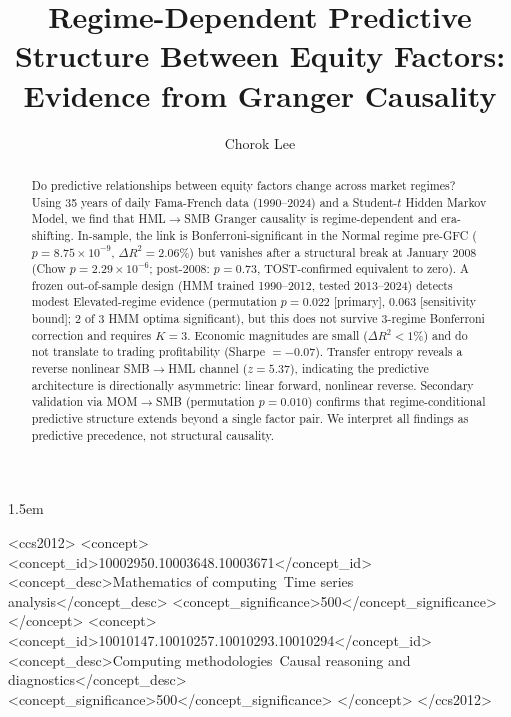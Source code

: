 \documentclass[sigconf,anonymous]{acmart}
\begin{document}
\sloppy
\emergencystretch 1.5em

\title{Regime-Dependent Predictive Structure Between Equity Factors: Evidence from Granger Causality}

\author{Chorok Lee}

\begin{abstract}
Do predictive relationships between equity factors change across market regimes?
Using 35 years of daily Fama-French data (1990--2024) and a Student-$t$ Hidden
Markov Model, we find that HML$\to$SMB Granger causality is regime-dependent and
era-shifting.
In-sample, the link is Bonferroni-significant in the Normal regime pre-GFC
($p = 8.75 \times 10^{-9}$, $\Delta R^2 = 2.06\%$) but vanishes after a
structural break at January 2008 (Chow $p = 2.29\times10^{-6}$; post-2008:
$p = 0.73$, TOST-confirmed equivalent to zero).
A frozen out-of-sample design (HMM trained 1990--2012, tested 2013--2024) detects
modest Elevated-regime evidence (permutation $p = 0.022$ [primary],
$0.063$ [sensitivity bound]; 2 of 3 HMM optima significant), but this does not
survive 3-regime Bonferroni correction and requires $K = 3$.
Economic magnitudes are small ($\Delta R^2 < 1\%$) and do not translate to
trading profitability (Sharpe $= -0.07$).
Transfer entropy reveals a reverse nonlinear SMB$\to$HML channel ($z = 5.37$),
indicating the predictive architecture is directionally asymmetric: linear forward,
nonlinear reverse.
Secondary validation via MOM$\to$SMB (permutation $p = 0.010$) confirms that
regime-conditional predictive structure extends beyond a single factor pair.
We interpret all findings as predictive precedence, not structural causality.
\end{abstract}

\begin{CCSXML}
<ccs2012>
   <concept>
       <concept_id>10002950.10003648.10003671</concept_id>
       <concept_desc>Mathematics of computing~Time series analysis</concept_desc>
       <concept_significance>500</concept_significance>
   </concept>
   <concept>
       <concept_id>10010147.10010257.10010293.10010294</concept_id>
       <concept_desc>Computing methodologies~Causal reasoning and diagnostics</concept_desc>
       <concept_significance>500</concept_significance>
   </concept>
</ccs2012>
\end{CCSXML}
\end{document}
